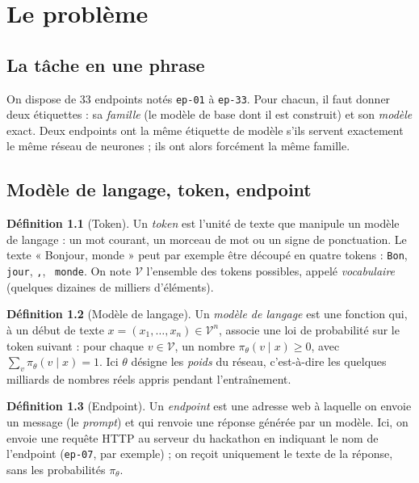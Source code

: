 \documentclass[11pt,a4paper]{report}
\theoremstyle{definition}
\newtheorem{definition}{Définition}[chapter]
\theoremstyle{plain}
\newcommand{\code}[1]{\texttt{#1}}
\begin{document}
\tableofcontents

\chapter{Le problème}

\section{La tâche en une phrase}

On dispose de 33 endpoints notés \code{ep-01} à \code{ep-33}. Pour chacun, il faut donner deux étiquettes : sa \emph{famille} (le modèle de base dont il est construit) et son \emph{modèle} exact. Deux endpoints ont la même étiquette de modèle s'ils servent exactement le même réseau de neurones ; ils ont alors forcément la même famille.

\section{Modèle de langage, token, endpoint}

\begin{definition}[Token]
Un \emph{token} est l'unité de texte que manipule un modèle de langage : un mot courant, un morceau de mot ou un signe de ponctuation. Le texte « Bonjour, monde » peut par exemple être découpé en quatre tokens : \code{Bon}, \code{jour}, \code{,}, \code{ monde}. On note $\mathcal V$ l'ensemble des tokens possibles, appelé \emph{vocabulaire} (quelques dizaines de milliers d'éléments).
\end{definition}

\begin{definition}[Modèle de langage]
Un \emph{modèle de langage} est une fonction qui, à un début de texte $x = (x_1,\dots,x_n) \in \mathcal V^n$, associe une loi de probabilité sur le token suivant : pour chaque $v\in\mathcal V$, un nombre $\pi_\theta(v \mid x) \ge 0$, avec $\sum_{v} \pi_\theta(v\mid x) = 1$. Ici $\theta$ désigne les \emph{poids} du réseau, c'est-à-dire les quelques milliards de nombres réels appris pendant l'entraînement.
\end{definition}

\begin{definition}[Endpoint]
Un \emph{endpoint} est une adresse web à laquelle on envoie un message (le \emph{prompt}) et qui renvoie une réponse générée par un modèle. Ici, on envoie une requête HTTP au serveur du hackathon en indiquant le nom de l'endpoint (\code{ep-07}, par exemple) ; on reçoit uniquement le texte de la réponse, sans les probabilités $\pi_\theta$.
\end{definition}
\end{document}
